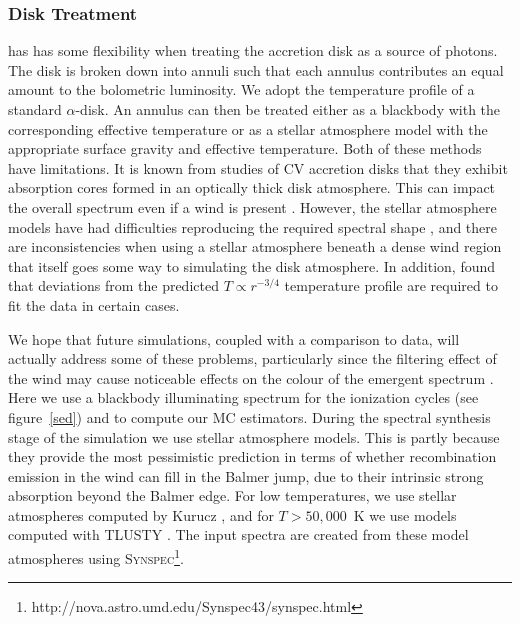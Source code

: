 \documentclass[preprint, a4paper, 11pt]{aastex}
\begin{document}
\subsubsection{Disk Treatment}

\py has has some flexibility when treating the accretion disk as a source of photons. 
The disk is broken down into annuli 
such that each annulus contributes an equal amount to the bolometric luminosity. 
We adopt the temperature profile of a standard \cite{shakurasunyaev1973} $\alpha$-disk.
An annulus can then
be treated either as a blackbody with the corresponding effective temperature or as a stellar atmosphere model
with the appropriate surface gravity and effective temperature. 
Both of these methods have limitations. It is known
from studies of CV accretion disks that they exhibit absorption cores 
formed in an optically thick disk atmosphere.
This can impact the overall spectrum even if a wind is present 
\citep[see e.g.][]{dhillon1996}.
However, the stellar atmosphere models
have had difficulties reproducing the required spectral shape \citep{wade1988}, 
and there are inconsistencies when using a 
stellar atmosphere beneath a dense
wind region that itself goes some way to simulating the disk atmosphere. 
In addition, \cite{linnell2010} found that deviations from the predicted 
$T\propto r^{-3/4}$ temperature profile are required to fit the data
in certain cases. 

We hope that future simulations, coupled with a comparison to data, will 
actually address some of these problems, particularly since
the filtering effect of the wind may cause noticeable effects
on the colour of the emergent spectrum \citep{hassall}. 
Here we use a blackbody illuminating spectrum
for the ionization cycles (see figure~\ref{sed}) and to compute our MC estimators.
During the spectral synthesis stage of the simulation we use stellar atmosphere models.
This is partly because they provide the most pessimistic prediction in terms of whether recombination emission in the 
wind can fill in the Balmer jump, due to their intrinsic strong absorption beyond the Balmer edge.
For low temperatures, we use stellar atmospheres computed 
by Kurucz \citep{kurucz1991}, and for $T>50,000$~K we use models computed with 
\textsc{TLUSTY} \citep{tlusty}. The input spectra are created from these model
atmospheres using \textsc{Synspec}\footnote{http://nova.astro.umd.edu/Synspec43/synspec.html}.
\end{document}
